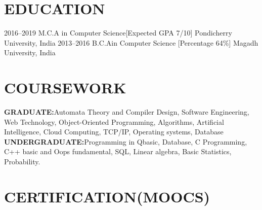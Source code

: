 \documentclass[]{cv-style}          %
\begin{document}


\section{EDUCATION}

\begin{entrylist}
\entry
{2016--2019}
{M.C.A {\normalfont in Computer Science}[Expected GPA 7/10]}
{Pondicherry University, India}
{\vspace{-0.3cm}}
\entry
{2013--2016}
{B.C.A{\normalfont in Computer Science} [Percentage 64\%]}
{Magadh University, India}

\end{entrylist}





\section{COURSEWORK}
 \vspace{-0.2cm}

\textbf{GRADUATE:}Automata Theory and Compiler Design, Software Engineering, Web Technology, Object-Oriented Programming, Algorithms, Artificial Intelligence, Cloud Computing, TCP/IP, Operating systems, Database\newline
\textbf{UNDERGRADUATE:}Programming in Qbasic, Database, C Programming, C++ basic and Oops fundamental, SQL, Linear algebra, Basic Statistics, Probability.


 





\section{CERTIFICATION(MOOCS)}
\end{document}
